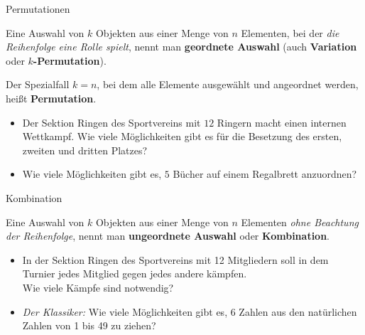 \documentclass[12pt,ngerman,a4paper,ignorenonframetext,]{beamer}
\begin{document}
\begin{frame}{Permutationen}
\protect\hypertarget{permutationen}{}


\begin{definition}

Eine Auswahl von \(k\) Objekten aus einer Menge von \(n\) Elementen, bei
der \emph{die Reihenfolge eine Rolle spielt}, nennt man
\textbf{geordnete Auswahl} (auch \textbf{Variation} oder
\textbf{\(k\)-Permutation}).

Der Spezialfall \(k=n\), bei dem alle Elemente ausgewählt und angeordnet
werden, heißt \textbf{Permutation}.

\end{definition}


\begin{Beispiele}[Permutationen]

\begin{itemize}
\item
  Der Sektion Ringen des Sportvereins mit \(12\) Ringern macht einen
  internen Wettkampf. Wie viele Möglichkeiten gibt es für die Besetzung
  des ersten, zweiten und dritten Platzes?
\item
  Wie viele Möglichkeiten gibt es, \(5\) Bücher auf einem Regalbrett
  anzuordnen?
\end{itemize}

\end{Beispiele}

\end{frame}

\begin{frame}{Kombination}
\protect\hypertarget{kombination}{}


\begin{definition}[Kombination]

Eine Auswahl von \(k\) Objekten aus einer Menge von \(n\) Elementen
\emph{ohne Beachtung der Reihenfolge}, nennt man \textbf{ungeordnete
Auswahl} oder \textbf{Kombination}.

\end{definition}


\begin{Beispiele}[Kombination]

\begin{itemize}
\item
  In der Sektion Ringen des Sportvereins mit 12 Mitgliedern soll in dem
  Turnier jedes Mitglied gegen jedes andere kämpfen.\\
  Wie viele Kämpfe sind notwendig?
\item
  \emph{Der Klassiker:} Wie viele Möglichkeiten gibt es, 6 Zahlen aus
  den natürlichen Zahlen von 1 bis 49 zu ziehen?
\end{itemize}

\end{Beispiele}

\end{frame}
\end{document}
